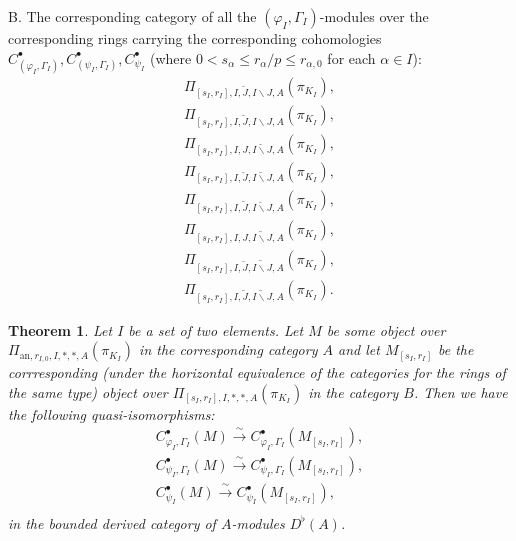 \documentclass[12pt]{amsart}
\newtheorem{theorem}{Theorem}[section]
\theoremstyle{definition}
\numberwithin{equation}{section}
\begin{document}
	
\noindent B. The corresponding category of all the $(\varphi_I,\Gamma_I)$-modules over the corresponding rings carrying the corresponding cohomologies $C^\bullet_{(\varphi_I,\Gamma_I)},C^\bullet_{(\psi_I,\Gamma_I)},C^\bullet_{\psi_I}$ (where $0<s_\alpha\leq r_\alpha/p\leq  r_{\alpha,0}$ for each $\alpha\in I$): \\

\begin{align}
\Pi_{[s_I,r_I],I,\breve{J},I\backslash J,A}(\pi_{K_I}),\\	
\Pi_{[s_I,r_I],I,\widetilde{J},I\backslash J,A}(\pi_{K_I}),\\
\Pi_{[s_I,r_I],I,J,\breve{I\backslash J},A}(\pi_{K_I}),\\	
\Pi_{[s_I,r_I],I,\breve{J},\breve{I\backslash J},A}(\pi_{K_I}),\\	
\Pi_{[s_I,r_I],I,\widetilde{J},\breve{I\backslash J},A}(\pi_{K_I}),\\
\Pi_{[s_I,r_I],I,J,\widetilde{I\backslash J},A}(\pi_{K_I}),\\	
\Pi_{[s_I,r_I],I,\breve{J},\widetilde{I\backslash J},A}(\pi_{K_I}),\\	
\Pi_{[s_I,r_I],I,\widetilde{J},\widetilde{I\backslash J},A}(\pi_{K_I}).	
\end{align}


\begin{theorem}
Let $I$ be a set of two elements. Let $M$ be some object over $\Pi_{\mathrm{an},r_{I,0},I,*,*,A}(\pi_{K_I})$ in the corresponding category $A$ and let $M_{[s_I,r_I]}$ be the corrresponding (under the horizontal equivalence of the categories for the rings of the same type) object over $\Pi_{[s_I,r_{I}],I,*,*,A}(\pi_{K_I})$ in the category $B$. Then we have the following quasi-isomorphisms:
\begin{align}
C^\bullet_{\varphi_I,\Gamma_I}(M)\overset{\sim}{\rightarrow}C^\bullet_{\varphi_I,\Gamma_I}(M_{[s_I,r_I]}), \\
C^\bullet_{\psi_I,\Gamma_I}(M)\overset{\sim}{\rightarrow}C^\bullet_{\psi_I,\Gamma_I}(M_{[s_I,r_I]}), \\
C^\bullet_{\psi_I}(M)\overset{\sim}{\rightarrow}C^\bullet_{\psi_I}(M_{[s_I,r_I]}), \\	
\end{align}
in the bounded derived category of $A$-modules $D^\flat(A)$.	
\end{theorem}
\end{document}
